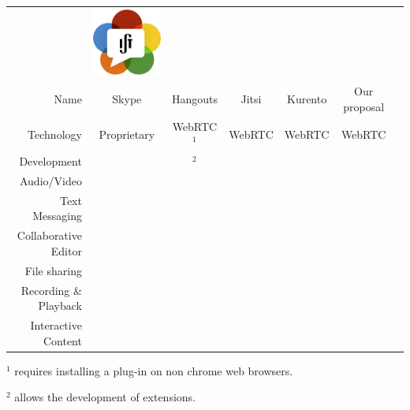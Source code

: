 \documentclass[compress]{beamer}
\newcommand{\cmark}{{\color{mygreen}\ding{51}}}%
\newcommand{\xmark}{{\color{red}\ding{55}}}%
\begin{document}
\begin{frame}[c]
\begin{table}[]
{\begin{tabular}{rcccccc}
 &
 \begin{minipage}{.1\textwidth}\includegraphics[width=\linewidth]{figures/logo.png}\end{minipage} \\

\tiny Name & \tiny Skype & \tiny Hangouts & \tiny Jitsi & \tiny Kurento & \tiny Our proposal   \\
\tiny Technology & \tiny Proprietary & \tiny WebRTC$^{1}$ & \tiny WebRTC & \tiny WebRTC & \tiny WebRTC \\
\tiny Development & \xmark & \cmark \tiny $^2$ & \cmark & \cmark & \cmark \\
\tiny Audio/Video & \cmark & \cmark & \cmark & \cmark & \cmark \\
\tiny Text Messaging & \cmark & \cmark & \cmark & \xmark  & \cmark \\
\tiny Collaborative Editor & \xmark & \cmark & \cmark & \xmark  & \cmark \\
\tiny File sharing & \cmark & \cmark & \cmark & \xmark  & \cmark\\
\tiny Recording \& Playback  & \xmark & \xmark & \xmark & \cmark  & \cmark \\
\tiny Interactive Content  & \xmark & \xmark & \xmark & \xmark  & \cmark 


\end{tabular}}
\end{table}

	\tiny{$^1$ requires installing a plug-in on non chrome web browsers.}

	\tiny{$^2$ allows the development of extensions.}

		\end{frame}
\end{document}
